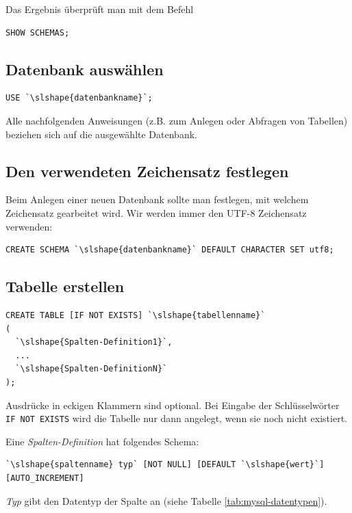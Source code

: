 Das Ergebnis überprüft man mit dem Befehl

\begin{lstlisting}
SHOW SCHEMAS;
\end{lstlisting}


\subsection{Datenbank auswählen}

\begin{lstlisting}
USE `\slshape{datenbankname}`;
\end{lstlisting}

Alle nachfolgenden Anweisungen (z.B. zum Anlegen oder Abfragen von Tabellen)
beziehen sich auf die ausgewählte Datenbank.


\subsection{Den verwendeten Zeichensatz festlegen}

Beim Anlegen einer neuen Datenbank sollte man festlegen, mit welchem Zeichensatz gearbeitet wird. Wir
werden immer den UTF-8 Zeichensatz verwenden:

\begin{lstlisting}
CREATE SCHEMA `\slshape{datenbankname}` DEFAULT CHARACTER SET utf8;
\end{lstlisting}


\subsection{Tabelle erstellen}

\begin{lstlisting}
CREATE TABLE [IF NOT EXISTS] `\slshape{tabellenname}`
(
  `\slshape{Spalten-Definition1}`,
  ...  
  `\slshape{Spalten-DefinitionN}`
);
\end{lstlisting}

Ausdrücke in eckigen Klammern sind optional. Bei Eingabe der Schlüsselwörter
\lstinline{IF NOT EXISTS} wird die Tabelle nur dann angelegt, wenn sie noch
nicht existiert.

Eine \textit{Spalten-Definition} hat folgendes Schema:

\begin{lstlisting}
`\slshape{spaltenname} typ` [NOT NULL] [DEFAULT `\slshape{wert}`] [AUTO_INCREMENT]
\end{lstlisting}

\textit{Typ} gibt den Datentyp der Spalte an (siehe Tabelle
\ref{tab:mysql-datentypen}).

